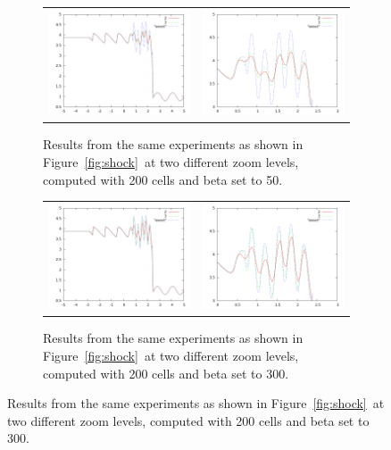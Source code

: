 \documentclass[10pt]{article}
\begin{document}
\begin{figure}[h]
\begin{figure}
  \begin{center}
	\begin{tabular}{cc}
      \includegraphics[width=.475\textwidth]{50.png} &
	  \includegraphics[width=.475\textwidth]{50zoom.png}
	\end{tabular}
  \end{center}
  \caption{Results from the same experiments as shown in Figure~\ref{fig:shock}~at two different zoom levels, computed with 200 cells and beta set to 50.}
\end{figure}

\begin{figure}
  \begin{center}
	\begin{tabular}{cc}
      \includegraphics[width=.475\textwidth]{300.png} &
	  \includegraphics[width=.475\textwidth]{300zoom.png}
	\end{tabular}
  \end{center}
  \caption{Results from the same experiments as shown in Figure~\ref{fig:shock}~at two different zoom levels, computed with 200 cells and beta set to 300.}
\end{figure}



\end{figure}
\end{document}
